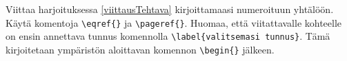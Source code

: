     \begin{harj}
        Viittaa harjoituksessa \ref{viittausTehtava} kirjoittamaasi numeroituun yhtälöön. Käytä komentoja \verb-\eqref{}- ja \verb-\pageref{}-.
        \vaihto
        Huomaa, että viitattavalle kohteelle on ensin annettava tunnus komennolla \verb-\label{valitsemasi tunnus}-. Tämä kirjoitetaan ympäristön aloittavan komennon \verb-\begin{}- jälkeen. 
    \end{harj}
